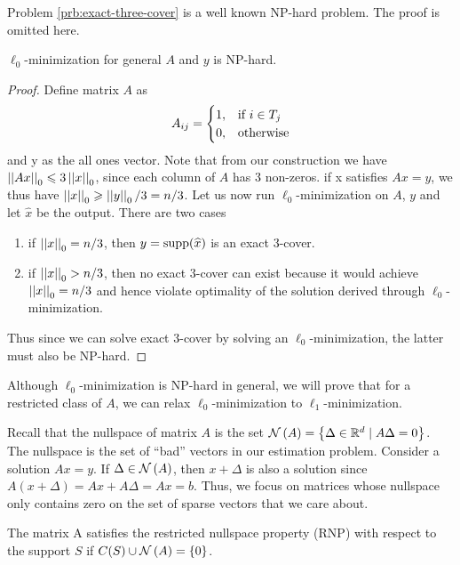 \documentclass[11pt]{article}
\begin{document}
\begin{remark}
    Problem \ref{prb:exact-three-cover} is a well known NP-hard problem. The proof is omitted here.
\end{remark}

\begin{theorem}
    \(\ell_0\)-minimization for general \(A\) and \(y\) is NP-hard.
\end{theorem}
\begin{proof}
    Define matrix \(A\) as
    \[A_{ij}=\begin{cases}
        1, & \text{if } i \in T_j\\
        0, & \textnormal{otherwise}
    \end{cases}\]
    and y as the all ones vector. Note that from our construction we have \(\left|\left|Ax\right|\right|_0 \leqslant 3\left|\left|x\right|\right|_0\), since each column of \(A\) has 3 non-zeros. if x satisfies \(Ax=y\), we thus have \(\left|\left|x\right|\right|_0 \geqslant \left|\left|y\right|\right|_0/3 = n/3\). Let us now run \(\ell_0\)-minimization on \(A\), \(y\) and let \(\widehat{x}\) be the output. There are two cases
    \begin{enumerate}
        \item if \(\left|\left|x\right|\right|_0 = n/3\), then \(y = \operatorname{supp}(\widehat{x})\) is an exact 3-cover.
        \item if \(\left|\left|x\right|\right|_0 > n/3\), then no exact 3-cover can exist because it would achieve \(\left|\left|x\right|\right|_0 = n/3\) and hence violate optimality of the solution derived through \(\ell_0\)-minimization.
    \end{enumerate}
    Thus since we can solve exact 3-cover by solving an \(\ell_0\)-minimization, the latter must also be NP-hard.
\end{proof}

Although \(\ell_0\)-minimization is NP-hard in general, we will prove that for a restricted class of \(A\), we can relax \(\ell_0\)-minimization to \(\ell_1\)-minimization.

Recall that the nullspace of matrix \(A\) is the set \(\mathcal N\left(A\right)=\left\{\Delta \in\mathbb R^d \mid A \Delta=0\right\}\). The nullspace is the set of ``bad'' vectors in our estimation problem. Consider a solution \(A x=y\). If \(\Delta \in\mathcal N\left(A\right)\), then \(x+\Delta\) is also a solution since \(A(x+\Delta)=A x+A \Delta= A x=b\). Thus, we focus on matrices whose nullspace only contains zero on the set of sparse vectors that we care about.

\begin{definition}
    The matrix A satisfies the restricted nullspace property (RNP) with respect to the support \(S\) if \(C(S) \cup \mathcal N\left(A\right)=\{0\}\).
\end{definition} 
\end{document}
